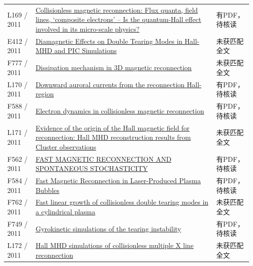 \begin{longtable}{P{24mm}P{97mm}P{27mm}}
L169 / 2011 & \href{https://doi.org/10.48550/arxiv.1103.1076}{Collisionless magnetic reconnection: Flux quanta,  field lines,  `composite electrons' -- Is the quantum-Hall effect involved in its micro-scale physics?} & 有PDF，待核读\\

E412 / 2011 & \href{https://ui.adsabs.harvard.edu/abs/2011APS..DPPNP9019A/abstract}{Diamagnetic Effects on Double Tearing Modes in Hall-MHD and PIC Simulations} & 未获匹配全文\\

F777 / 2011 & \href{https://doi.org/10.1063/1.3642609}{Dissipation mechanism in 3D magnetic reconnection} & 未获匹配全文\\

L170 / 2011 & \href{https://doi.org/10.5194/angeo-29-679-2011}{Downward auroral currents from the reconnection Hall-region} & 有PDF，待核读\\

F588 / 2011 & \href{https://doi.org/10.1007/s11434-011-4440-0}{Electron dynamics in collisionless magnetic reconnection} & 有PDF，待核读\\

L171 / 2011 & \href{https://doi.org/10.1029/2011ja016991}{Evidence of the origin of the Hall magnetic field for reconnection: Hall MHD reconstruction results from Cluster observations} & 未获匹配全文\\

F562 / 2011 & \href{https://doi.org/10.1088/0004-637x/743/1/51}{FAST MAGNETIC RECONNECTION AND SPONTANEOUS STOCHASTICITY} & 有PDF，待核读\\

F584 / 2011 & \href{https://doi.org/10.1103/physrevlett.106.215003}{Fast Magnetic Reconnection in Laser-Produced Plasma Bubbles} & 有PDF，待核读\\

F762 / 2011 & \href{https://doi.org/10.1088/0029-5515/51/3/033003}{Fast linear growth of collisionless double tearing modes in a cylindrical plasma} & 未获匹配全文\\

F749 / 2011 & \href{https://doi.org/10.1063/1.3659035}{Gyrokinetic simulations of the tearing instability} & 有PDF，待核读\\

L172 / 2011 & \href{https://doi.org/10.1029/2010ja015992}{Hall MHD simulations of collisionless multiple X line reconnection} & 未获匹配全文\\


\end{longtable}
